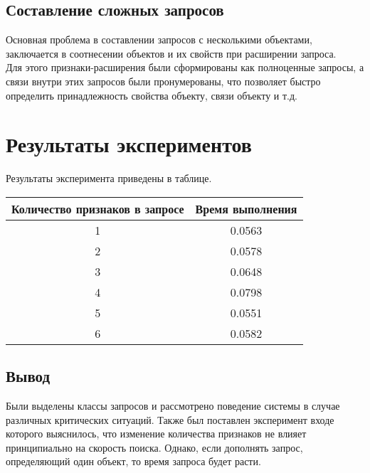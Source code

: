 \subsection{Составление сложных запросов}
Основная проблема в составлении запросов с несколькими объектами, заключается в соотнесении объектов и их свойств при расширении запроса.\\
Для этого признаки-расширения были сформированы как полноценные запросы, а связи внутри этих запросов были пронумерованы, что позволяет быстро определить принадлежность свойства объекту, связи объекту и т.д.
\section{Результаты экспериментов}
Результаты эксперимента приведены в таблице.\\
\begin{tabular}{|c|c|}
\hline
Количество признаков в запросе & Время выполнения\\
\hline
1 & 0.0563\\
2 & 0.0578\\ 
3 & 0.0648\\
4 & 0.0798\\
5 & 0.0551\\
6 & 0.0582\\
\hline
\end{tabular}

\subsection{Вывод}
Были выделены классы запросов и рассмотрено поведение системы в случае различных критических ситуаций. Также  был поставлен эксперимент входе которого выяснилось, что изменение количества признаков не влияет принципиально на скорость поиска. Однако, если дополнять запрос, определяющий один объект, то время запроса будет расти. 
